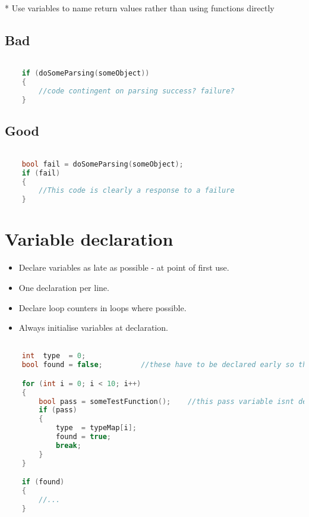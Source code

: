 * Use variables to name return values rather than using functions directly

\subsection{Bad}

\begin{lstlisting}[language=c++]

    if (doSomeParsing(someObject))
    {
        //code contingent on parsing success? failure?
    }
\end{lstlisting}

\subsection{Good}
\begin{lstlisting}[language=c++]

    bool fail = doSomeParsing(someObject);
    if (fail)
    {
        //This code is clearly a response to a failure
    }
\end{lstlisting}

\section{Variable declaration}

\begin{itemize}
\item Declare variables as late as possible - at point of first use.
\item One declaration per line.
\item Declare loop counters in loops where possible.
\item Always initialise variables at declaration.
\end{itemize}

\begin{lstlisting}[language=c++]

    int  type  = 0;
    bool found = false;         //these have to be declared early so they can be used after the for loop

    for (int i = 0; i < 10; i++)
    {
        bool pass = someTestFunction();    //this pass variable isnt declared until it's used - good
        if (pass)
        {
            type  = typeMap[i];
            found = true;
            break;
        }
    }

    if (found)
    {
        //...
    }    
\end{lstlisting}

